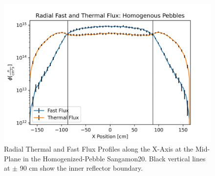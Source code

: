 \begin{figure}[H]
\centering

  \includegraphics[width=0.75\linewidth]{figures/fast_therm_flux_homog_er.png}

\caption{Radial Thermal and Fast Flux Profiles along the X-Axis at the Mid-Plane in the Homogenized-Pebble Sangamon20.  Black vertical lines at $\pm$ 90 cm show the inner reflector boundary.}
\label{fig:hom-det-xy}
\end{figure}